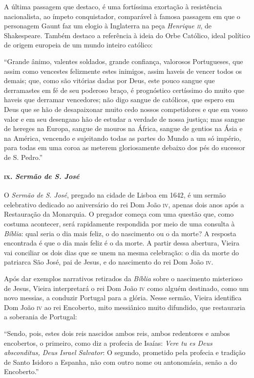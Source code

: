 A última passagem que destaco, é uma fortíssima exortação à resistência
nacionalista, ao ímpeto conquistador, comparável à famosa passagem em
que o personagem Gaunt faz um elogio à Inglaterra na peça \emph{Henrique
\textsc{ii}}, de Shakespeare. Também destaco a referência à ideia do Orbe
Católico, ideal político de origem europeia de um mundo inteiro
católico:

``Grande ânimo, valentes soldados, grande confiança, valorosos
Portugueses, que assim como vencestes felizmente estes inimigos, assim
haveis de vencer todos os demais; que, como são vitórias dadas por Deus,
este pouco sangue que derramastes em fé de seu poderoso braço, é
prognóstico certíssimo do muito que haveis que derramar vencedores; não
digo sangue de católicos, que espero em Deus que se hão de desapaixonar
muito cedo nossos competidores e que em vosso valor e em seu desengano
hão de estudar a verdade de nossa justiça; mas sangue de hereges na
Europa, sangue de mouros na África, sangue de gentios na Ásia e na
América, vencendo e sujeitando todas as partes do Mundo a um só império,
para todas em uma coroa as meterem gloriosamente debaixo dos pés do
sucessor de S. Pedro.''

\paragraph{\textsc{ix}. \emph{Sermão de S. José}}

O \emph{Sermão de S. José}, pregado na cidade de Lisboa em 1642, é um
sermão celebrativo dedicado ao aniversário do rei Dom João \textsc{iv}, apenas
dois anos após a Restauração da Monarquia. O pregador começa com uma
questão que, como costuma acontecer, será rapidamente respondida por
meio de uma consulta à \emph{Bíblia}: qual seria o dia mais feliz, o do
nascimento ou o da morte? A resposta encontrada é que o dia mais feliz é
o da morte. A partir dessa abertura, Vieira vai conciliar os dois dias
que se unem na mesma celebração: o dia da morte do patriarca São José,
pai de Jesus, e do nascimento do rei Dom João \textsc{iv}.

Após dar exemplos narrativos retirados da \emph{Bíblia} sobre o
nascimento misterioso de Jesus, Vieira interpretará o rei Dom João \textsc{iv}
como alguém destinado, como um novo messias, a conduzir Portugal para a
glória. Nesse sermão, Vieira identifica Dom João \textsc{iv} ao rei Encoberto,
mito messiânico muito difundido, que restauraria a soberania de
Portugal:

``Sendo, pois, estes dois reis nascidos ambos reis, ambos redentores e
ambos encobertos, o primeiro, como diz a profecia de Isaías: \emph{Vere
tu es Deus absconditus, Deus Israel Salvator}: O segundo, prometido pela
profecia e tradição de Santo Isidoro a Espanha, não com outro nome ou
antonomásia, senão a do Encoberto.''

